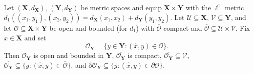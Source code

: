 \begin{lemma}
Let $(\mathbf X,d_{\mathbf X})$, $(\mathbf Y,d_{\mathbf Y})$ be metric spaces and equip $\mathbf X\times\mathbf Y$ with the $\ell^1$ metric $d_1((x_1,y_1),(x_2,y_2))=d_{\mathbf X}(x_1,x_2)+d_{\mathbf Y}(y_1,y_2)$. Let $\mathcal U\subseteq\mathbf X$, $\mathcal V\subseteq\mathbf Y$, and let $\mathcal O\subseteq\mathbf X\times\mathbf Y$ be open and bounded (for $d_1$) with $\overline{\mathcal O}$ compact and $\overline{\mathcal O}\subseteq\mathcal U\times\mathcal V$. Fix $\hat x\in\mathbf X$ and set
\[
\mathcal O_{\mathbf Y}=\{y\in\mathbf Y:(\hat x,y)\in\mathcal O\}.
\]
Then $\mathcal O_{\mathbf Y}$ is open and bounded in $\mathbf Y$, $\overline{\mathcal O_{\mathbf Y}}$ is compact, $\overline{\mathcal O_{\mathbf Y}}\subseteq\mathcal V$, $\overline{\mathcal O_{\mathbf Y}}\subseteq\{y:(\hat x,y)\in\overline{\mathcal O}\}$, and $\partial\mathcal O_{\mathbf Y}\subseteq\{y:(\hat x,y)\in\partial\mathcal O\}$.
\end{lemma}
